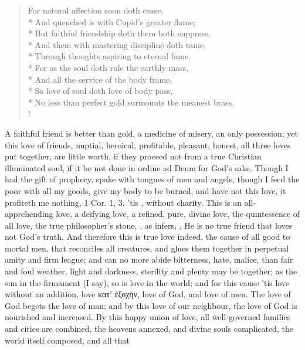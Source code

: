 {\begin{verse}
For natural affection soon doth cease,\\*
And quenched is with Cupid's greater flame;\\*
But faithful friendship doth them both suppress,\\*
And them with mastering discipline doth tame,\\*
Through thoughts aspiring to eternal fame.\\*
For as the soul doth rule the earthly mass,\\*
And all the service of the body frame,\\*
So love of soul doth love of body pass,\\*
No less than perfect gold surmounts the meanest brass.\\!
\end{verse}
%
A faithful friend is better than gold, a medicine of
misery, an only possession; yet this love of friends, nuptial,
heroical, profitable, pleasant, honest, all three loves put together,
are little worth, if they proceed not from a true Christian illuminated
soul, if it be not done in ordine ad Deum for God's sake. Though I had
the gift of prophecy, spake with tongues of men and angels, though I
feed the poor with all my goods, give my body to be burned, and have
not this love, it profiteth me nothing, 1 Cor.  1, 3. 'tis
, without charity. This is an all-apprehending love,
a deifying love, a refined, pure, divine love, the quintessence of all
love, the true philosopher's stone, , as \Austin{}
infers, , He is no true friend that loves not God's truth. And
therefore this is true love indeed, the cause of all good to mortal
men, that reconciles all creatures, and glues them together in
perpetual amity and firm league; and can no more abide bitterness,
hate, malice, than fair and foul weather, light and darkness, sterility
and plenty may be together; as the sun in the firmament (I say), so is
love in the world; and for this cause 'tis love without an addition,
love \textgreek{κατ' ἐξοχὴν}, love of God, and love of men. The love of God
begets the love of man; and by this love of our neighbour, the love of
God is nourished and increased. By this happy union of love, all
well-governed families and cities are combined, the heavens annexed,
and divine souls complicated, the world itself composed, and all that
}
